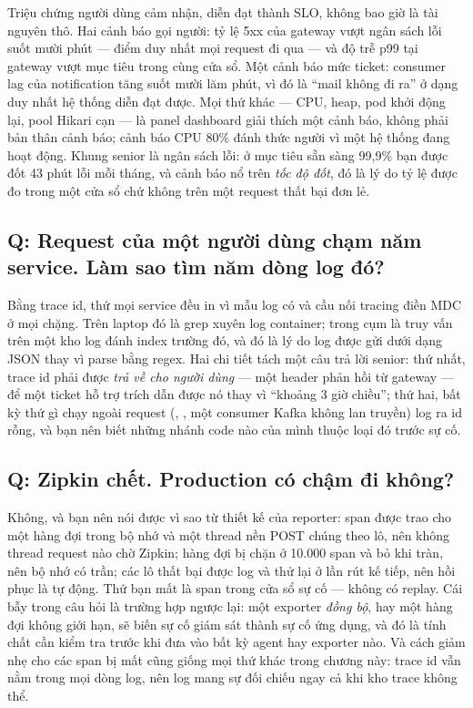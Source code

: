 Triệu chứng người dùng cảm nhận, diễn đạt thành SLO, không bao giờ là
tài nguyên thô. Hai cảnh báo gọi người: tỷ lệ 5xx của gateway vượt ngân
sách lỗi suốt mười phút --- điểm duy nhất mọi request đi qua --- và độ
trễ p99 tại gateway vượt mục tiêu trong cùng cửa sổ. Một cảnh báo mức
ticket: consumer lag của notification tăng suốt mười lăm phút, vì đó là
``mail không đi ra'' ở dạng duy nhất hệ thống diễn đạt được. Mọi thứ
khác --- CPU, heap, pod khởi động lại, pool Hikari cạn --- là panel
dashboard giải thích một cảnh báo, không phải bản thân cảnh báo; cảnh
báo CPU 80\% đánh thức người vì một hệ thống đang hoạt động. Khung
senior là ngân sách lỗi: ở mục tiêu sẵn sàng 99,9\% bạn được đốt 43
phút lỗi mỗi tháng, và cảnh báo nổ trên \emph{tốc độ đốt}, đó là lý do
tỷ lệ được đo trong một cửa sổ chứ không trên một request thất bại
đơn lẻ.

\subsection*{Q: Request của một người dùng chạm năm service. Làm sao tìm năm dòng log đó?}

Bằng trace id, thứ mọi service đều in vì mẫu log có
 và cầu nối tracing điền MDC ở mọi chặng. Trên
laptop đó là grep xuyên log container; trong cụm là truy vấn trên một
kho log đánh index trường đó, và đó là lý do log được gửi dưới dạng
JSON thay vì parse bằng regex. Hai chi tiết tách một câu trả lời
senior: thứ nhất, trace id phải được \emph{trả về cho người dùng} ---
một header phản hồi  từ gateway --- để một ticket hỗ
trợ trích dẫn được nó thay vì ``khoảng 3 giờ chiều''; thứ hai, bất kỳ
thứ gì chạy ngoài request (, , một
consumer Kafka không lan truyền) log ra id rỗng, và bạn nên biết những
nhánh code nào của mình thuộc loại đó trước sự cố.

\subsection*{Q: Zipkin chết. Production có chậm đi không?}

Không, và bạn nên nói được vì sao từ thiết kế của reporter: span được
trao cho một hàng đợi trong bộ nhớ và một thread nền POST chúng theo
lô, nên không thread request nào chờ Zipkin; hàng đợi bị chặn ở 10.000
span và bỏ khi tràn, nên bộ nhớ có trần; các lô thất bại được log và
thử lại ở lần rút kế tiếp, nên hồi phục là tự động. Thứ bạn mất là span
trong cửa sổ sự cố --- không có replay. Cái bẫy trong câu hỏi là trường
hợp ngược lại: một exporter \emph{đồng bộ}, hay một hàng đợi không
giới hạn, sẽ biến sự cố giám sát thành sự cố ứng dụng, và đó là tính
chất cần kiểm tra trước khi đưa vào bất kỳ agent hay exporter nào. Và
cách giảm nhẹ cho các span bị mất cũng giống mọi thứ khác trong chương
này: trace id vẫn nằm trong mọi dòng log, nên log mang sự đối chiếu
ngay cả khi kho trace không thể.

